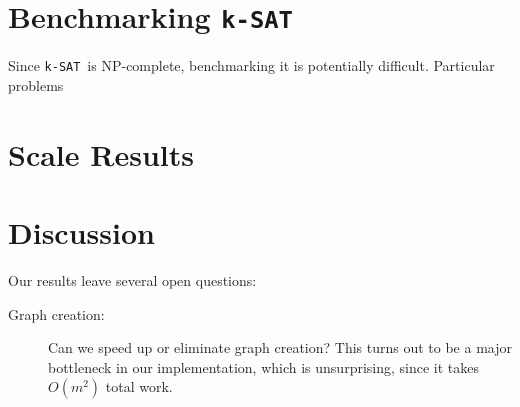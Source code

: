 \documentclass[twocolumn]{article}
\newcommand{\ksat}{\texttt{k-SAT}~}
\begin{document}
\section{Benchmarking \ksat}
\label{sec:benchmarks}
Since \ksat is NP-complete, benchmarking it is potentially difficult.  Particular problems %

\section{Scale Results}
\label{sec:scaling}

\section{Discussion}
\label{sec:discussion}
Our results leave several open questions:
\begin{description}
  \item[Graph creation:] Can we speed up or eliminate graph creation?  This turns out to be a major bottleneck in our implementation, which is unsurprising, since it takes $O(m^2)$ total work.
\end{description}




\end{document}
